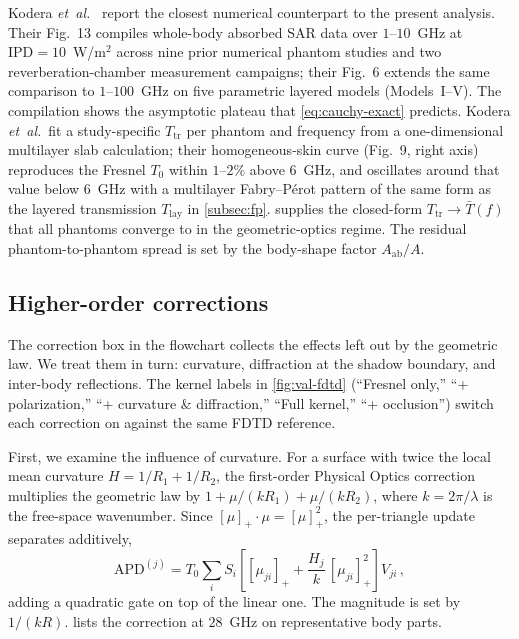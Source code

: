 \documentclass[journal,twocolumn,10pt]{IEEEtran}
\theoremstyle{plain}
\newcommand{\IPD}{\mathrm{IPD}}
\newcommand{\APD}{\mathrm{APD}}
\newcommand{\Aab}{A_{\mathrm{ab}}}
\newcommand{\Tbar}{\bar{T}}
\newcommand{\Tlay}{T_{\mathrm{lay}}}
\newcommand{\pospart}[1]{\left[#1\right]_{+}}
\begin{document}
Kodera \textit{et~al.}~\cite{Kodera2024} report the closest numerical
counterpart to the present analysis. Their Fig.~13 compiles
whole-body absorbed SAR data over $1$--$10$~GHz at
$\IPD = 10$~W/m$^2$ across nine prior numerical phantom studies and
two reverberation-chamber measurement campaigns; their Fig.~6
extends the same comparison to $1$--$100$~GHz on five parametric
layered models (Models~I--V). The compilation shows the asymptotic
plateau that \eqref{eq:cauchy-exact} predicts. Kodera
\textit{et~al.}\ fit a study-specific $T_{\mathrm{tr}}$ per phantom
and frequency from a one-dimensional multilayer slab calculation;
their homogeneous-skin curve (Fig.~9, right axis) reproduces the
Fresnel $T_0$ within $1$--$2\%$ above $6$~GHz, and oscillates around
that value below $6$~GHz with a multilayer Fabry--P\'erot pattern of
the same form as the layered transmission $\Tlay$ in
\cref{subsec:fp}.  supplies the closed-form
$T_{\mathrm{tr}} \to \Tbar(f)$ that all phantoms converge to in the
geometric-optics regime. The residual phantom-to-phantom spread is
set by the body-shape factor $\Aab/A$.

\subsection{Higher-order corrections}\label{subsec:corr-residuals}

The correction box in the flowchart collects the effects left out by
the geometric law. We treat them in turn: curvature, diffraction at
the shadow boundary, and inter-body reflections. The kernel labels in
\cref{fig:val-fdtd} (``Fresnel only,'' ``+ polarization,'' ``+
curvature \& diffraction,'' ``Full kernel,'' ``+ occlusion'') switch
each correction on against the same FDTD reference.

First, we examine the influence of curvature. For a surface with
twice the local mean curvature $H = 1/R_1 +
1/R_2$, the first-order Physical Optics correction multiplies the
geometric law by $1 + \mu/(kR_1) + \mu/(kR_2)$, where
$k = 2\pi/\lambda$ is the free-space wavenumber. Since
$\pospart{\mu}\cdot\mu = \pospart{\mu}^2$, the per-triangle update
separates additively,
\begin{equation}\label{eq:curv-update}
  \APD^{(j)} = T_0 \sum_i S_i\!\left[
  \pospart{\mu_{ji}} + \frac{H_j}{k}\,\pospart{\mu_{ji}}^2 \right]
  V_{ji}\, ,
\end{equation}
adding a quadratic gate on top of the linear one. The magnitude is
set by $1/(kR)$.  lists the correction at
$28$~GHz on representative body parts.
\end{document}
